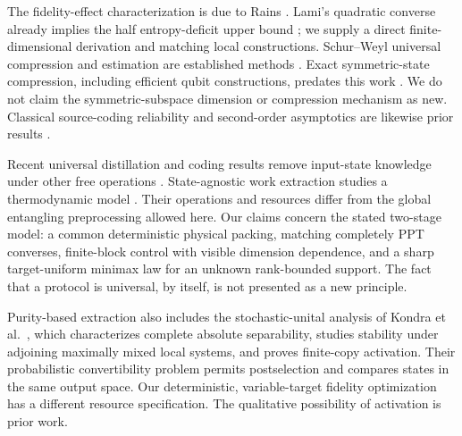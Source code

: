 The fidelity-effect characterization is due to Rains \cite{rains}. Lami's quadratic converse already implies the half entropy-deficit upper bound \cite{lami}; we supply a direct finite-dimensional derivation and matching local constructions. Schur--Weyl universal compression and estimation are established methods \cite{jhhh,kw,hayashi-univ}. Exact symmetric-state compression, including efficient qubit constructions, predates this work \cite{plesch,baertschi}. We do not claim the symmetric-subspace dimension or compression mechanism as new. Classical source-coding reliability and second-order asymptotics are likewise prior results \cite{hayashi-second}.

Recent universal distillation and coding results remove input-state knowledge under other free operations \cite{takagi,tirone,llf,rizzo}. State-agnostic work extraction studies a thermodynamic model \cite{watanabe,zeng}. Their operations and resources differ from the global entangling preprocessing allowed here. Our claims concern the stated two-stage model: a common deterministic physical packing, matching completely PPT converses, finite-block control with visible dimension dependence, and a sharp target-uniform minimax law for an unknown rank-bounded support. The fact that a protocol is universal, by itself, is not presented as a new principle.

Purity-based extraction also includes the stochastic-unital analysis of Kondra et al.\ \cite{kondra}, which characterizes complete absolute separability, studies stability under adjoining maximally mixed local systems, and proves finite-copy activation. Their probabilistic convertibility problem permits postselection and compares states in the same output space. Our deterministic, variable-target fidelity optimization has a different resource specification. The qualitative possibility of activation is prior work.
